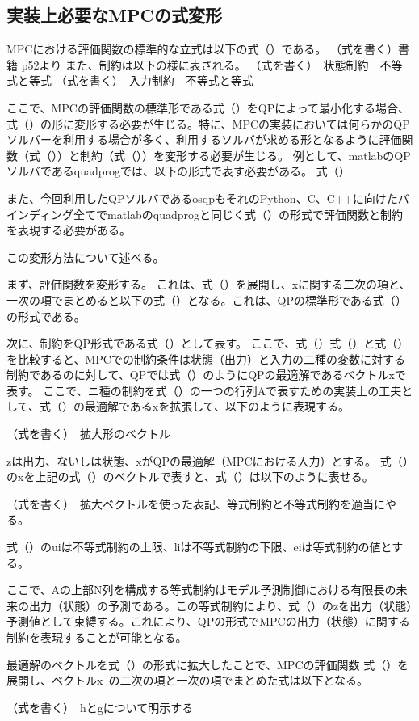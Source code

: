 \subsection{実装上必要なMPCの式変形}
MPCにおける評価関数の標準的な立式は以下の式（）である。
（式を書く）書籍 p52より
また、制約は以下の様に表される。
（式を書く）　状態制約　不等式と等式
（式を書く）　入力制約　不等式と等式

ここで、MPCの評価関数の標準形である式（）をQPによって最小化する場合、式（）の形に変形する必要が生じる。特に、MPCの実装においては何らかのQPソルバーを利用する場合が多く、利用するソルバが求める形となるように評価関数（式（））と制約（式（））を変形する必要が生じる。
例として、matlab\cite{MATLAB:2021}のQPソルバであるquadprog\cite{MATLABQUADPLOG}では、以下の形式で表す必要がある。
式（）

また、今回利用したQPソルバであるosqp\cite{OSQP}もそれのPython、C、C++に向けたバインディング全てでmatlabのquadprogと同じく式（）の形式で評価関数と制約を表現する必要がある。

この変形方法について述べる。

まず、評価関数を変形する。
これは、式（）を展開し、xに関する二次の項と、一次の項でまとめると以下の式（）となる。これは、QPの標準形である式（）の形式である。


次に、制約をQP形式である式（）として表す。
ここで、式（）式（）と式（）を比較すると、MPCでの制約条件は状態（出力）と入力の二種の変数に対する制約であるのに対して、QPでは式（）のようにQPの最適解であるベクトルxで表す。
ここで、ニ種の制約を式（）の一つの行列Aで表すための実装上の工夫として、式（）の最適解であるxを拡張して、以下のように表現する。

（式を書く）　拡大形のベクトル

zは出力、ないしは状態、xがQPの最適解（MPCにおける入力）とする。
式（）のxを上記の式（）のベクトルで表すと、式（）は以下のように表せる。

（式を書く）　拡大ベクトルを使った表記、等式制約と不等式制約を適当にやる。

式（）のuiは不等式制約の上限、liは不等式制約の下限、eiは等式制約の値とする。

ここで、Aの上部N列を構成する等式制約はモデル予測制御における有限長の未来の出力（状態）の予測である。この等式制約により、式（）のzを出力（状態）予測値として束縛する。これにより、QPの形式でMPCの出力（状態）に関する制約を表現することが可能となる。

最適解のベクトルを式（）の形式に拡大したことで、MPCの評価関数 式（）を展開し、ベクトルx~の二次の項と一次の項でまとめた式は以下となる。

（式を書く）　hとgについて明示する
